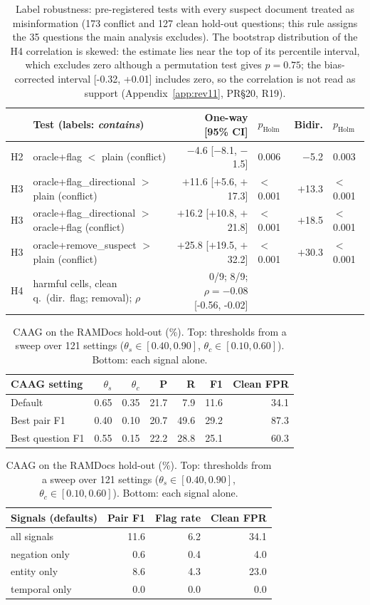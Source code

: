 \begin{table}[t]
\centering\small
\begin{tabular}{llrlrl}
\toprule
& Test (labels: \emph{contains}) & One-way [95\% CI] & $p_{\text{Holm}}$ & Bidir. & $p_{\text{Holm}}$ \\
\midrule
H2 & oracle+flag $<$ plain (conflict) & $-$4.6 [$-$8.1, $-$1.5] & 0.006 & $-$5.2 & 0.003 \\
H3 & oracle+flag\_directional $>$ plain (conflict) & $+$11.6 [$+$5.6, $+$17.3] & $<$0.001 & $+$13.3 & $<$0.001 \\
H3 & oracle+flag\_directional $>$ oracle+flag (conflict) & $+$16.2 [$+$10.8, $+$21.8] & $<$0.001 & $+$18.5 & $<$0.001 \\
H3 & oracle+remove\_suspect $>$ plain (conflict) & $+$25.8 [$+$19.5, $+$32.2] & $<$0.001 & $+$30.3 & $<$0.001 \\
H4 & harmful cells, clean q.\ (dir.\ flag; removal); $\rho$ & 0/9; 8/9; $\rho=-0.08$ [-0.56, -0.02] & & & \\
\bottomrule
\end{tabular}
\caption{Label robustness: pre-registered tests with every suspect document treated as misinformation
(173 conflict and 127 clean hold-out questions; this rule assigns the 35 questions the
main analysis excludes). The bootstrap distribution of the H4 correlation is skewed: the estimate lies near the top of its percentile interval, which excludes zero although a permutation test gives $p=0.75$; the bias-corrected interval [-0.32, +0.01] includes zero, so the correlation is not read as support (Appendix~\ref{app:rev11}, PR\S20, R19).}
\label{tab:contains}
\end{table}

\begin{table}[t]
\centering\small
\setlength{\tabcolsep}{3pt}
\begin{tabular}{lrrrrrr}
\toprule
CAAG setting & $\theta_s$ & $\theta_c$ & P & R & F1 & Clean FPR \\
\midrule
Default & 0.65 & 0.35 & 21.7 & 7.9 & 11.6 & 34.1 \\
Best pair F1 & 0.40 & 0.10 & 20.7 & 49.6 & 29.2 & 87.3 \\
Best question F1 & 0.55 & 0.15 & 22.2 & 28.8 & 25.1 & 60.3 \\
\bottomrule
\end{tabular}

\vspace{4pt}
\begin{tabular}{lrrr}
\toprule
Signals (defaults) & Pair F1 & Flag rate & Clean FPR \\
\midrule
all signals & 11.6 & 6.2 & 34.1 \\
negation only & 0.6 & 0.4 & 4.0 \\
entity only & 8.6 & 4.3 & 23.0 \\
temporal only & 0.0 & 0.0 & 0.0 \\
\bottomrule
\end{tabular}
\caption{CAAG on the RAMDocs hold-out (\%). Top: thresholds from a sweep over 121 settings
($\theta_s\in[0.40,0.90]$, $\theta_c\in[0.10,0.60]$). Bottom: each signal alone.}
\label{tab:caag}
\end{table}

